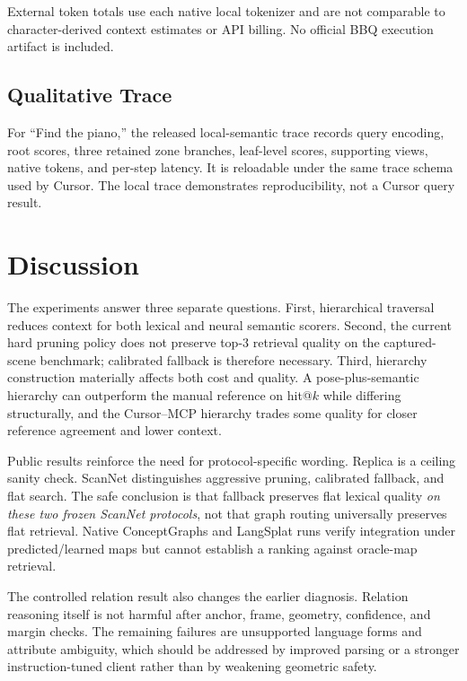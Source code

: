 \documentclass[10pt,twocolumn,letterpaper]{article}
\begin{document}
External token totals use each native local tokenizer and are not comparable
to character-derived context estimates or API billing. No official BBQ
execution artifact is included.

\subsection{Qualitative Trace}
For ``Find the piano,'' the released local-semantic trace records query
encoding, root scores, three retained zone branches, leaf-level scores,
supporting views, native tokens, and per-step latency. It is reloadable under
the same trace schema used by Cursor. The local trace demonstrates
reproducibility, not a Cursor query result.

\section{Discussion}
The experiments answer three separate questions. First, hierarchical traversal
reduces context for both lexical and neural semantic scorers. Second, the
current hard pruning policy does not preserve top-3 retrieval quality on the
captured-scene benchmark; calibrated fallback is therefore necessary. Third,
hierarchy construction materially affects both cost and quality. A
pose-plus-semantic hierarchy can outperform the manual reference on hit@$k$
while differing structurally, and the Cursor--MCP hierarchy trades some
quality for closer reference agreement and lower context.

Public results reinforce the need for protocol-specific wording. Replica is a
ceiling sanity check. ScanNet distinguishes aggressive pruning, calibrated
fallback, and flat search. The safe conclusion is that fallback preserves flat
lexical quality \emph{on these two frozen ScanNet protocols}, not that graph
routing universally preserves flat retrieval. Native ConceptGraphs and LangSplat
runs verify integration under predicted/learned maps but cannot establish a
ranking against oracle-map retrieval.

The controlled relation result also changes the earlier diagnosis. Relation
reasoning itself is not harmful after anchor, frame, geometry, confidence, and
margin checks. The remaining failures are unsupported language forms and
attribute ambiguity, which should be addressed by improved parsing or a
stronger instruction-tuned client rather than by weakening geometric safety.
\end{document}
